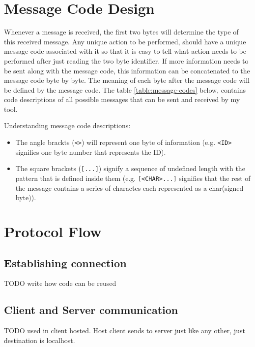 \section{Message Code Design}
Whenever a message is received, the first two bytes will determine the type of this received message. Any unique action to be performed, should have a unique message code associated with it so that it is easy to tell what action needs to be performed after just reading the two byte identifier. If more information needs to be sent along with the message code, this information can be concatenated to the message code byte by byte. The meaning of each byte after the message code will be defined by the message code. The table \ref{table:message-codes} below, contains code descriptions of all possible messages that can be sent and received by my tool.

Understanding message code descriptions:
\begin{itemize}
\item The angle brackts (\lstinline{<>}) will represent one byte of information (e.g. \lstinline{<ID>} signifies one byte number that represents the ID).
\item The square brackets (\lstinline{[...]}) signify a sequence of undefined length with the pattern that is defined inside them (e.g. \lstinline{[<CHAR>...]} signifies that the rest of the message contains a series of charactes each represented as a char(signed byte)).
\end{itemize}
\vfill


\newpage

\section{Protocol Flow}

\subsection{Establishing connection}
TODO write how code can be reused


\newpage


\subsection{Client and Server communication}
TODO used in client hosted. Host client sends to server just like any other, just destination is localhost.

